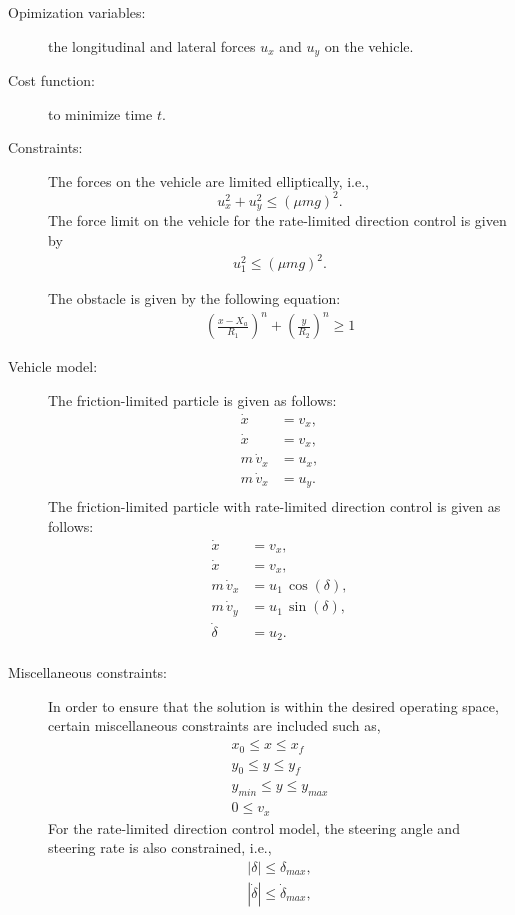\begin{description}
    \item[Opimization variables:] the longitudinal and lateral forces $u_x$ and $u_y$ on the vehicle. 
    \item[Cost function:] to minimize time $t$.
    \item[Constraints:] The forces on the vehicle are limited elliptically, i.e., \begin{equation*}
        u_x^2 + u_y^2 \leq (\mu m g)^2.
    \end{equation*}
    The force limit on the vehicle for the rate-limited direction control is given by \begin{align*}
        u_1^2 \leq (\mu m g)^2.
    \end{align*}\par The obstacle is given by the following equation:
    \begin{align*}
        \left(\frac{x - X_a}{R_1}\right)^n + \left(\frac{y}{R_2}\right)^n \geq 1
    \end{align*}
    \item[Vehicle model:] The friction-limited particle is given as follows: \begin{align*}
        \dot x &= v_x, \\
        \dot x &= v_x, \\
        m\,\dot v_x &= u_x,\\
        m\,\dot v_x &= u_y. \\
    \end{align*}
    The friction-limited particle with rate-limited direction control is given as follows: \begin{align*}
        \dot x &= v_x, \\
        \dot x &= v_x, \\
        m\,\dot v_x &= u_1\,\cos\left(\delta\right),\\
        m\,\dot v_y &= u_1\,\sin\left(\delta\right), \\
        \dot \delta &= u_2. \\
    \end{align*}
    \item[Miscellaneous constraints:] In order to ensure that the solution is within the desired operating space, certain miscellaneous constraints are included such as, \begin{align*}
        x_0 \leq x \leq x_f\\
        y_0 \leq y \leq y_f\\
        y_{min} \leq y \leq y_{max} \\
        0 \leq v_x 
    \end{align*} 
    For the rate-limited direction control model, the steering angle and steering rate is also constrained, i.e., \begin{align*}
        |\delta| \leq \delta_{max}, \\
        |\dot\delta| \leq \dot\delta_{max}, \\
    \end{align*}
\end{description}

